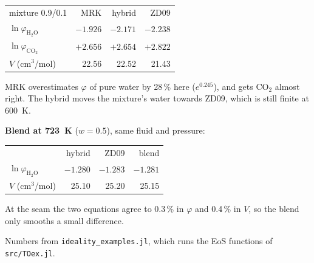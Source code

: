 \documentclass[11pt]{article}
\begin{document}
{\begin{minipage}[t]{0.37\linewidth}
\smallskip
\begin{tabular}{@{}l r r r@{}}
  mixture 0.9/0.1                           & MRK      & hybrid   & ZD09     \\
  $\ln\varphi_{\mathrm{H_2O}}$              & $-1.926$ & $-2.171$ & $-2.238$ \\
  $\ln\varphi_{\mathrm{CO_2}}$              & $+2.656$ & $+2.654$ & $+2.822$ \\
  $V$ (cm$^3$/mol)                          & 22.56    & 22.52    & 21.43    \\
\end{tabular}

\smallskip
MRK overestimates $\varphi$ of pure water by 28\,\% here ($e^{0.245}$), and gets CO$_2$ almost right. The hybrid moves the mixture's water towards ZD09, which is still finite at 600~K.

\smallskip
\textbf{Blend at 723~K} ($w=0.5$), same fluid and pressure:

\smallskip
\begin{tabular}{@{}l r r r@{}}
                                            & hybrid   & ZD09     & blend    \\
  $\ln\varphi_{\mathrm{H_2O}}$              & $-1.280$ & $-1.283$ & $-1.281$ \\
  $V$ (cm$^3$/mol)                          & 25.10    & 25.20    & 25.15    \\
\end{tabular}

\smallskip
At the seam the two equations agree to 0.3\,\% in $\varphi$ and 0.4\,\% in $V$, so the blend only smooths a small difference.

\smallskip
{\footnotesize Numbers from \texttt{ideality\_examples.jl}, which runs the EoS functions of \texttt{src/TOex.jl}.}
\end{minipage}
}

\clearpage
\end{document}
